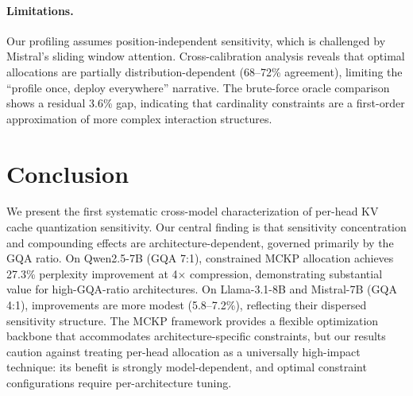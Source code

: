 \documentclass[11pt]{article}
\begin{document}
\paragraph{Limitations.}
Our profiling assumes position-independent sensitivity, which is challenged by Mistral's sliding window attention.
Cross-calibration analysis reveals that optimal allocations are partially distribution-dependent (68--72\% agreement), limiting the ``profile once, deploy everywhere'' narrative.
The brute-force oracle comparison shows a residual 3.6\% gap, indicating that cardinality constraints are a first-order approximation of more complex interaction structures.

\section{Conclusion}

We present the first systematic cross-model characterization of per-head KV cache quantization sensitivity.
Our central finding is that sensitivity concentration and compounding effects are architecture-dependent, governed primarily by the GQA ratio.
On Qwen2.5-7B (GQA 7:1), constrained MCKP allocation achieves 27.3\% perplexity improvement at 4$\times$ compression, demonstrating substantial value for high-GQA-ratio architectures.
On Llama-3.1-8B and Mistral-7B (GQA 4:1), improvements are more modest (5.8--7.2\%), reflecting their dispersed sensitivity structure.
The MCKP framework provides a flexible optimization backbone that accommodates architecture-specific constraints, but our results caution against treating per-head allocation as a universally high-impact technique: its benefit is strongly model-dependent, and optimal constraint configurations require per-architecture tuning.


\end{document}
